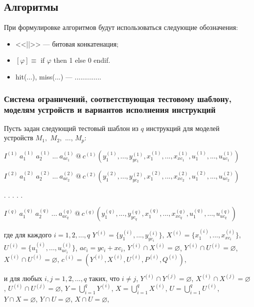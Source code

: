 \subsection{Алгоритмы}

При формулировке алгоритмов будут использоваться следующие обозначения:
\begin{itemize}
  \item <<||>> --- битовая конкатенация;
  \item $[\varphi] \equiv $ if $\varphi$ then 1 else 0 endif.
  \item hit(...), miss(...) --- ..............
\end{itemize}

\subsubsection*{Система ограничений, соответствующая тестовому шаблону, моделям устройств и вариантов исполнения инструкций}

Пусть задан следующий тестовый шаблон из $q$ инструкций для моделей устройств $M_1,$ $M_2,$ ..., $M_p$:

$I^{(1)}~a_1^{(1)}~a_2^{(1)}~...~a_{ac_1}^{(1)}~\mbox{@}~c^{(1)}( y_1^{(1)}, ..., y_{yc_1}^{(1)}, x_1^{(1)}, ..., x_{xc_1}^{(1)}, u_1^{(1)}, ..., u_{uc_1}^{(1)})$

$I^{(2)}~a_1^{(2)}~a_2^{(2)}~...~a_{ac_2}^{(2)}~\mbox{@}~c^{(2)}( y_1^{(2)}, ..., y_{yc_2}^{(2)}, x_1^{(2)}, ..., x_{xc_2}^{(2)}, u_1^{(2)}, ..., u_{uc_2}^{(2)})$

. . . . .

$I^{(q)}~a_1^{(q)}~a_2^{(q)}~...~a_{ac_q}^{(q)}~\mbox{@}~c^{(q)}( y_1^{(q)}, ..., y_{yc_q}^{(q)}, x_1^{(q)}, ..., x_{xc_q}^{(q)}, u_1^{(q)}, ..., u_{uc_q}^{(q)})$

где для каждого $i = 1, 2, ..., q$ $Y^{(i)} = \{ y_1^{(i)}, ..., y_{yc_i}^{(i)} \}$, $X^{(i)} = \{ x_1^{(i)}, ..., x_{xc_i}^{(i)} \}$, $U^{(i)} = \{ u_1^{(i)}, ..., u_{uc_i}^{(i)} \}$, $ac_i = yc_i + xc_i$, $Y^{(i)} \cap X^{(i)} = \varnothing$, $Y^{(i)} \cap U^{(i)} = \varnothing$, $X^{(i)} \cap U^{(i)} = \varnothing$, $c^{(i)} = (Y^{(i)}, X^{(i)}, U^{(i)}, P^{(i)}, Q^{(i)})$,

и для любых $i, j = 1, 2, ..., q$ таких, что $i \neq j$, $Y^{(i)} \cap Y^{(j)} = \varnothing$, $X^{(i)} \cap X^{(j)} = \varnothing$, $U^{(i)} \cap U^{(j)} = \varnothing$, $Y = \bigcup_{i=1}^q Y^{(i)}$, $X = \bigcup_{i=1}^q X^{(i)}$, $U = \bigcup_{i=1}^q U^{(i)}$, $Y \cap X = \varnothing$, $Y \cap U = \varnothing$, $X \cap U = \varnothing$,

